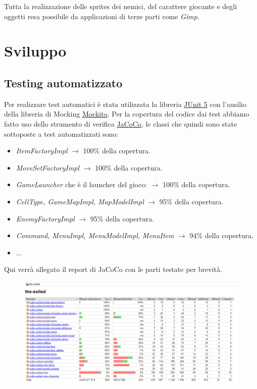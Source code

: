 \documentclass[a4paper,12pt]{report}
\begin{document}
Tutta la realizzazione delle sprites dei nemici, del carattere giocante e degli oggetti resa possibile da applicazioni di terze parti come \textit{Gimp}.

\chapter{Sviluppo}

\section{Testing automatizzato}
Per realizzare test automatici è stata utilizzata la libreria \href{https://junit.org/junit5/}{JUnit 5} con l'ausilio della libreria di Mocking \href{https://github.com/mockito/mockito}{Mockito}. Per la copertura del codice dai test abbiamo fatto uso dello strumento di verifica \href{https://www.eclemma.org/jacoco/}{JaCoCo}, le classi che quindi sono state sottoposte a test automatizzati sono:

\begin{itemize}
	\item \textit{ItemFactoryImpl} $\longrightarrow$ 100\% della copertura.
	\item \textit{MoveSetFactoryImpl} $\longrightarrow$ 100\% della copertura.
	\item \textit{GameLauncher} che è il launcher del gioco: $\longrightarrow$ 100\% della copertura.
	\item \textit{CellType, GameMapImpl, MapModelImpl} $\longrightarrow$ 95\% della copertura.
	\item \textit{EnemyFactoryImpl} $\longrightarrow$ 95\% della copertura.
	\item \textit{Command, MenuImpl, MenuModelImpl, MenuItem} $\longrightarrow$ 94\% della copertura.
	\item ...
\end{itemize}

Qui verrà allegato il report di JaCoCo con le parti testate per brevità.

\begin{figure}[H]
	\centering
	\includegraphics[scale=0.5]{jacoco-report.png}
\end{figure}
\end{document}
